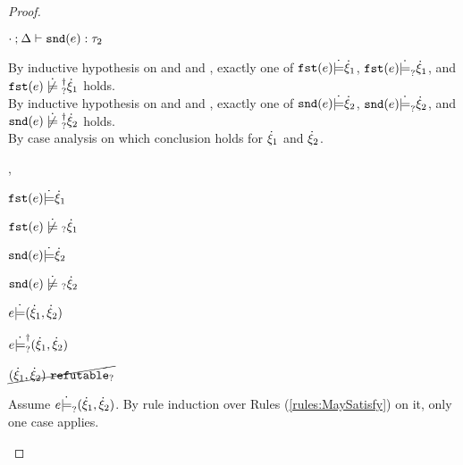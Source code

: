 \begin{proof}
\begin{byCases}
\begin{byCases}
\begin{pfsteps*}
        \item $\cdot \mathbin{;} \Delta \vdash \mathtt{snd}(e) : \tau_2$  
        \end{pfsteps*}
        By inductive hypothesis on  and  and , exactly one of $\mathtt{fst}(e) \dot{\models} \dot{\xi}_1$, $\mathtt{fst}(e) \dot{\models}_{?} \dot{\xi}_1$, and $\cnotsatisfyormay{\hfst{e}}{\hxi_1}$ holds. \\
        By inductive hypothesis on  and  and , exactly one of $\mathtt{snd}(e) \dot{\models} \dot{\xi}_2$, $\mathtt{snd}(e) \dot{\models}_{?} \dot{\xi}_2$, and $\cnotsatisfyormay{\hsnd{e}}{\hxi_2}$ holds. \\
        By case analysis on which conclusion holds for $\dot{\xi}_1$ and $\dot{\xi}_2$.
        \begin{byCases}
        \item[\csatisfy{\hfst{e}}{\hxi_1},\csatisfy{\hsnd{e}}{\hxi_2}]
            \begin{pfsteps*}
            \item $\mathtt{fst}(e) \dot{\models} \dot{\xi}_1$  
            \item $\cnotmaysatisfy{\hfst{e}}{\hxi_1}$  
            \item $\mathtt{snd}(e) \dot{\models} \dot{\xi}_2$  
            \item $\cnotmaysatisfy{\hsnd{e}}{\hxi_2}$  
            \item $e \dot{\models} (\dot{\xi}_1 , \dot{\xi}_2)$  
            \item $e \dot{\models}_{?}^{\dag} (\dot{\xi}_1 , \dot{\xi}_2)$ 
            \item $\cancel{(\dot{\xi}_1 , \dot{\xi}_2) ~\mathtt{refutable}_?}$  
            \end{pfsteps*}
            Assume $e \dot{\models}_{?} (\dot{\xi}_1 , \dot{\xi}_2)$. By rule induction over Rules (\ref{rules:MaySatisfy}) on it, only one case applies.
            \begin{byCases}

\end{byCases}
\end{byCases}
\end{byCases}
\end{byCases}
\end{proof}
